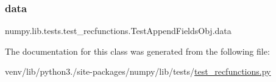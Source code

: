 \subsubsection{\texorpdfstring{data}{data}}
{\footnotesize\ttfamily numpy.\+lib.\+tests.\+test\+\_\+recfunctions.\+Test\+Append\+Fields\+Obj.\+data}



The documentation for this class was generated from the following file\+:\begin{DoxyCompactItemize}
\item 
venv/lib/python3./site-\/packages/numpy/lib/tests/\hyperlink{test__recfunctions_8py}{test\+\_\+recfunctions.\+py}\end{DoxyCompactItemize}
